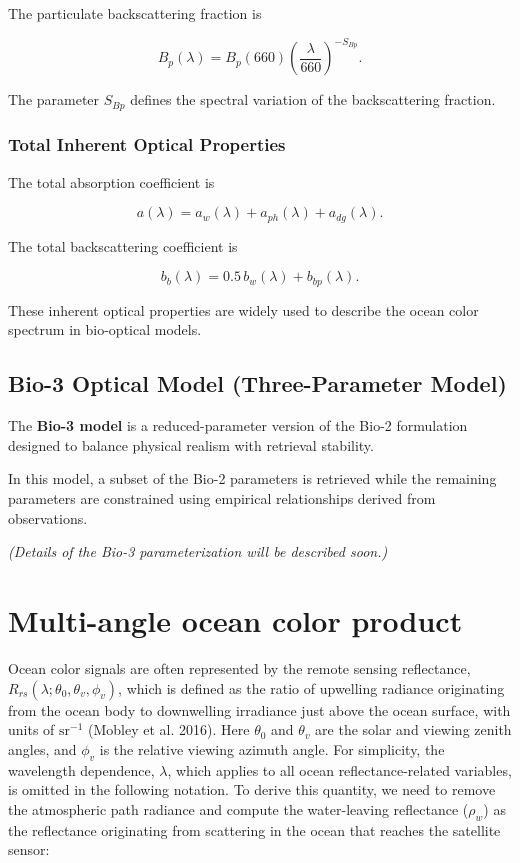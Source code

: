 \documentclass[
  11pt,
  letterpaper,
  DIV=11,
  numbers=noendperiod]{scrreprt}
\begin{document}
The particulate backscattering fraction is

\[
B_p(\lambda) =
B_p(660)\left(\frac{\lambda}{660}\right)^{-S_{Bp}}.
\]

The parameter \(S_{Bp}\) defines the spectral variation of the
backscattering fraction.

\subsection{Total Inherent Optical
Properties}\label{total-inherent-optical-properties}

The total absorption coefficient is

\[
a(\lambda) =
a_w(\lambda) + a_{ph}(\lambda) + a_{dg}(\lambda).
\]

The total backscattering coefficient is

\[
b_b(\lambda) =
0.5\,b_w(\lambda) + b_{bp}(\lambda).
\]

These inherent optical properties are widely used to describe the ocean
color spectrum in bio-optical models.

\section{Bio-3 Optical Model (Three-Parameter
Model)}\label{bio-3-optical-model-three-parameter-model}

The \textbf{Bio-3 model} is a reduced-parameter version of the Bio-2
formulation designed to balance physical realism with retrieval
stability.

In this model, a subset of the Bio-2 parameters is retrieved while the
remaining parameters are constrained using empirical relationships
derived from observations.

\emph{(Details of the Bio-3 parameterization will be described soon.)}

\chapter{Multi-angle ocean color
product}\label{multi-angle-ocean-color-product}

Ocean color signals are often represented by the remote sensing
reflectance, \(R_{rs}(\lambda;\theta_0, \theta_v, \phi_v)\), which is
defined as the ratio of upwelling radiance originating from the ocean
body to downwelling irradiance just above the ocean surface, with units
of \(\mathrm{sr}^{-1}\) (Mobley et al. 2016). Here \(\theta_0\) and
\(\theta_v\) are the solar and viewing zenith angles, and \(\phi_v\) is
the relative viewing azimuth angle. For simplicity, the wavelength
dependence, \(\lambda\), which applies to all ocean reflectance-related
variables, is omitted in the following notation. To derive this
quantity, we need to remove the atmospheric path radiance and compute
the water-leaving reflectance (\(\rho_w\)) as the reflectance
originating from scattering in the ocean that reaches the satellite
sensor:
\end{document}
